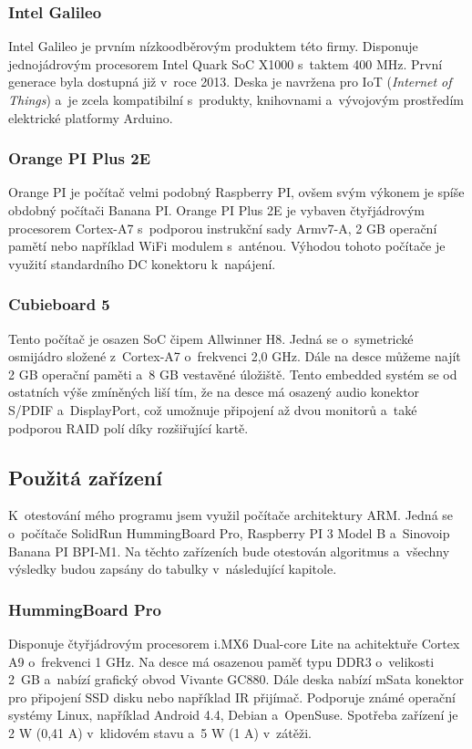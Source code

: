 \subsubsection*{Intel Galileo}
Intel Galileo je prvním nízkoodběrovým produktem této firmy. Disponuje jednojádrovým procesorem Intel Quark SoC X1000 s~taktem 400 MHz. První generace byla dostupná již v~roce 2013. Deska je navržena pro IoT (\textit{Internet of Things}) a~je zcela kompatibilní s~produkty, knihovnami a~vývojovým prostředím elektrické platformy Arduino. 

\subsubsection*{Orange PI Plus 2E}
Orange PI je počítač velmi podobný Raspberry PI, ovšem svým výkonem je spíše obdobný počítači Banana PI. Orange PI Plus 2E je vybaven čtyřjádrovým procesorem Cortex-A7 s~podporou instrukční sady Armv7-A, 2 GB operační pamětí nebo například WiFi modulem s~anténou. Výhodou tohoto počítače je využití standardního DC konektoru k~napájení.

\subsubsection*{Cubieboard 5}
Tento počítač je osazen SoC čipem Allwinner H8. Jedná se o~symetrické osmijádro složené z~Cortex-A7 o~frekvenci 2,0 GHz. Dále na desce můžeme najít 2 GB operační paměti a~8 GB vestavěné úložiště. Tento embedded systém se od ostatních výše zmíněných liší tím, že na desce má osazený audio konektor S/PDIF a~DisplayPort, což umožnuje připojení až dvou monitorů a~také podporou RAID polí díky rozšiřující kartě. 

\subsection{Použitá zařízení}
K~otestování mého programu jsem využil počítače architektury ARM. Jedná se o~počítače SolidRun HummingBoard Pro, Raspberry PI 3 Model B a~Sinovoip Banana PI BPI-M1. Na těchto zařízeních bude otestován algoritmus a~všechny výsledky budou zapsány do tabulky v~následující kapitole.

\subsubsection*{HummingBoard Pro}
 Disponuje čtyřjádrovým procesorem i.MX6 Dual-core Lite na achitektuře Cortex A9 o~frekvenci 1 GHz. Na desce má osazenou paměť typu DDR3 o~velikosti 2~GB a~nabízí grafický obvod Vivante GC880. Dále deska nabízí mSata konektor pro připojení SSD disku nebo například IR přijímač. Podporuje známé operační systémy Linux, například Android 4.4, Debian a~OpenSuse. Spotřeba zařízení je 2 W (0,41 A) v~klidovém stavu a~5 W (1 A) v~zátěži.

